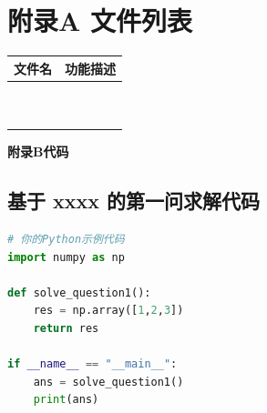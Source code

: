 \section{附录A 文件列表}
\begin{table}[H] %
\centering %
\begin{tabular}{|c|c|} %
\hline %
文件名 & 功能描述 \\ \hline
 &  \\ \hline
 &  \\ \hline
 &  \\ \hline
 &  \\ \hline
 &  \\ \hline
 &  \\ \hline
 &  \\ \hline
 &  \\ \hline
 &  \\ \hline
 &  \\ \hline
\end{tabular}
\end{table}


\begin{center}
\Large\textbf{附录B代码}
\end{center}

\subsection*{基于 xxxx 的第一问求解代码}
\begin{lstlisting}[language=Python]
# 你的Python示例代码
import numpy as np

def solve_question1():
    res = np.array([1,2,3])
    return res

if __name__ == "__main__":
    ans = solve_question1()
    print(ans)
\end{lstlisting}



